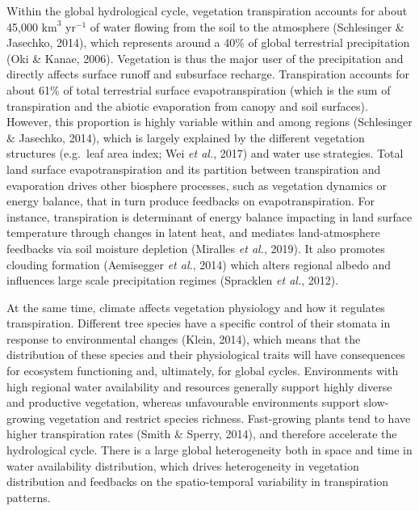 \documentclass[11pt,twoside]{reedthesis}
\begin{document}
Within the global hydrological cycle, vegetation transpiration accounts
for about 45,000 \(\text{km}^3\) \(\text{yr}^{-1}\) of water flowing
from the soil to the atmosphere (Schlesinger \& Jasechko, 2014), which
represents around a 40\% of global terrestrial precipitation (Oki \&
Kanae, 2006). Vegetation is thus the major user of the precipitation and
directly affects surface runoff and subsurface recharge. Transpiration
accounts for about 61\% of total terrestrial surface evapotranspiration
(which is the sum of transpiration and the abiotic evaporation from
canopy and soil surfaces). However, this proportion is highly variable
within and among regions (Schlesinger \& Jasechko, 2014), which is
largely explained by the different vegetation structures (e.g.~leaf area
index; Wei \emph{et al.}, 2017) and water use strategies. Total land
surface evapotranspiration and its partition between transpiration and
evaporation drives other biosphere processes, such as vegetation
dynamics or energy balance, that in turn produce feedbacks on
evapotranspiration. For instance, transpiration is determinant of energy
balance impacting in land surface temperature through changes in latent
heat, and mediates land-atmosphere feedbacks via soil moisture depletion
(Miralles \emph{et al.}, 2019). It also promotes clouding formation
(Aemisegger \emph{et al.}, 2014) which alters regional albedo and
influences large scale precipitation regimes (Spracklen \emph{et al.},
2012).\par

At the same time, climate affects vegetation physiology and how it
regulates transpiration. Different tree species have a specific control
of their stomata in response to environmental changes (Klein, 2014),
which means that the distribution of these species and their
physiological traits will have consequences for ecosystem functioning
and, ultimately, for global cycles. Environments with high regional
water availability and resources generally support highly diverse and
productive vegetation, whereas unfavourable environments support
slow-growing vegetation and restrict species richness. Fast-growing
plants tend to have higher transpiration rates (Smith \& Sperry, 2014),
and therefore accelerate the hydrological cycle. There is a large global
heterogeneity both in space and time in water availability distribution,
which drives heterogeneity in vegetation distribution and feedbacks on
the spatio-temporal variability in transpiration patterns.\par
\end{document}
